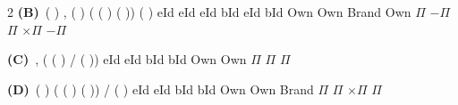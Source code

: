 \documentclass[a4paper,10pt,twoside]{article}
\begin{document}
\begin{multicols}{2}
\textbf{(B)}~( \newline ) \newline , \newline ( \newline ) \newline ( \newline ( \newline ) \newline ( \newline )) \newline ( \newline ) \newline eId \newline eId \newline eId \newline bId \newline eId bId \newline Own \newline Own \newline Brand \newline Own \newline $\Pi$ \newline −$\Pi$ \newline $\Pi$ \newline $\times$$\Pi$ \newline −$\Pi$\par\vspace{2pt}\noindent
\textbf{(C)}~, \newline ( \newline ( \newline ) / \newline ( \newline )) \newline eId \newline eId bId \newline bId \newline Own \newline Own \newline $\Pi$ \newline $\Pi$ \newline $\Pi$\par\vspace{2pt}\noindent
\textbf{(D)}~( \newline ) \newline ( \newline ( \newline ) \newline ( \newline )) / \newline ( \newline ) \newline eId \newline eId \newline bId \newline bId \newline Own \newline Own \newline Brand \newline $\Pi$ \newline $\Pi$ \newline $\times$$\Pi$ \newline $\Pi$

\end{multicols}
\end{document}
